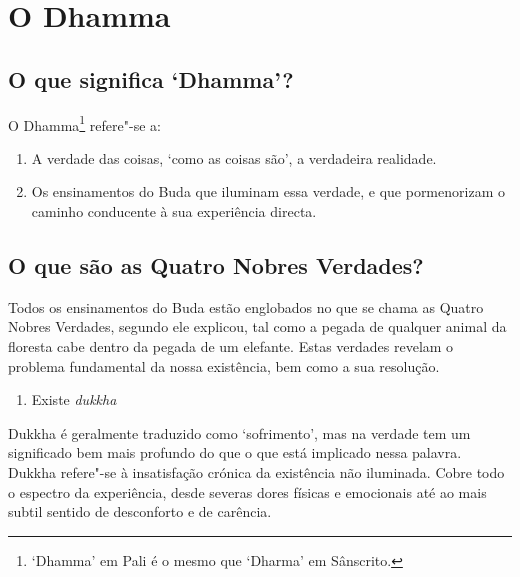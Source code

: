 

\setlength{\chapterTitleTopSkip}{10mm}


\chapter{O Dhamma}

\section{O que significa `Dhamma'?}

O Dhamma\footnote{`Dhamma' em Pali é o mesmo que `Dharma' em Sânscrito.}
refere"-se a:

\begin{enumerate}
\item
  A verdade das coisas, `como as coisas são', a verdadeira realidade.
\item
  Os ensinamentos do Buda que iluminam essa verdade, e que pormenorizam
  o caminho conducente à sua experiência directa.
\end{enumerate}

\section{O que são as Quatro Nobres Verdades?}

Todos os ensinamentos do Buda estão englobados no que se chama as Quatro
Nobres Verdades, segundo ele explicou, tal como a pegada de qualquer
animal da floresta cabe dentro da pegada de um elefante. Estas verdades
revelam o problema fundamental da nossa existência, bem como a sua
resolução.

\begin{enumerate}[topsep=0pt]
\item Existe \emph{dukkha}
\end{enumerate}

Dukkha é geralmente traduzido como `sofrimento', mas na verdade tem um
significado bem mais profundo do que o que está implicado nessa palavra.
Dukkha refere"-se à insatisfação crónica da existência não iluminada.
Cobre todo o espectro da experiência, desde severas dores físicas e
emocionais até ao mais subtil sentido de desconforto e de carência.

